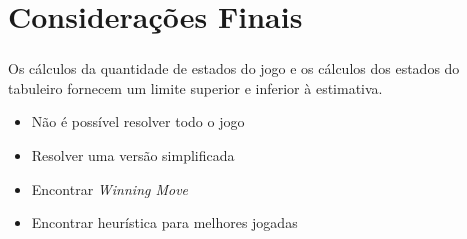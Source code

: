 \section{Considerações Finais}

\begin{frame}[fragile]
\frametitle{\secname}
Os cálculos da quantidade de estados do jogo e os cálculos dos estados do tabuleiro fornecem um limite superior e inferior à estimativa.
	\begin{itemize}
		\item Não é possível resolver todo o jogo
		\item Resolver uma versão simplificada
		\item Encontrar \emph{Winning Move}
		\item Encontrar heurística para melhores jogadas
	\end{itemize}
\end{frame}
